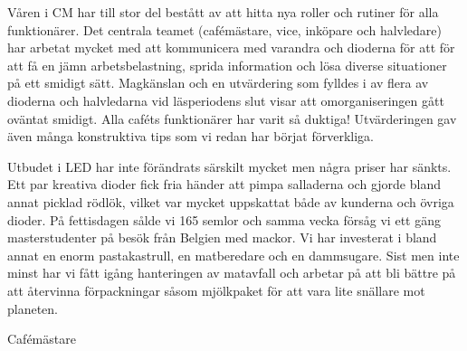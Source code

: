 \documentclass[../_main/handlingar.tex]{subfiles}
\begin{document}
Våren i CM har till stor del bestått av att hitta nya roller och rutiner för alla funktionärer. Det centrala teamet (cafémästare, vice, inköpare och halvledare) har arbetat mycket med att kommunicera med varandra och dioderna för att för att få en jämn arbetsbelastning, sprida information och lösa diverse situationer på ett smidigt sätt. Magkänslan och en utvärdering som fylldes i av flera av dioderna och halvledarna vid läsperiodens slut visar att omorganiseringen gått oväntat smidigt. Alla caféts funktionärer har varit så duktiga!
Utvärderingen gav även många konstruktiva tips som vi redan har börjat förverkliga.

Utbudet i LED har inte förändrats särskilt mycket men några priser har sänkts. Ett par kreativa dioder fick fria händer att pimpa salladerna och gjorde bland annat picklad rödlök, vilket var mycket uppskattat både av kunderna och övriga dioder. På fettisdagen sålde vi 165 semlor och samma vecka försåg vi ett gäng masterstudenter på besök från Belgien med mackor. Vi har investerat i bland annat en enorm pastakastrull, en matberedare och en dammsugare. Sist men inte minst har vi fått igång hanteringen av matavfall och arbetar på att bli bättre på att återvinna förpackningar såsom mjölkpaket för att vara lite snällare mot planeten.
\begin{signatures}{1}
    \mvh
    \signature{Elin Johansson}{Cafémästare}
\end{signatures}
\end{document}
